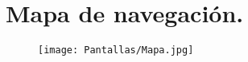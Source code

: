 \newpage
\section{Mapa de navegación.}
\begin{figure}[htbp!]
	\begin{center}
		\texttt{[image: Pantallas/Mapa.jpg]}
	\end{center}
\end{figure}


